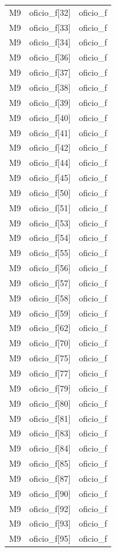 \begin{longtable}{lll}
M9 & oficio\_f[32] & oficio\_f \\
M9 & oficio\_f[33] & oficio\_f \\
M9 & oficio\_f[34] & oficio\_f \\
M9 & oficio\_f[36] & oficio\_f \\
M9 & oficio\_f[37] & oficio\_f \\
M9 & oficio\_f[38] & oficio\_f \\
M9 & oficio\_f[39] & oficio\_f \\
M9 & oficio\_f[40] & oficio\_f \\
M9 & oficio\_f[41] & oficio\_f \\
M9 & oficio\_f[42] & oficio\_f \\
M9 & oficio\_f[44] & oficio\_f \\
M9 & oficio\_f[45] & oficio\_f \\
M9 & oficio\_f[50] & oficio\_f \\
M9 & oficio\_f[51] & oficio\_f \\
M9 & oficio\_f[53] & oficio\_f \\
M9 & oficio\_f[54] & oficio\_f \\
M9 & oficio\_f[55] & oficio\_f \\
M9 & oficio\_f[56] & oficio\_f \\
M9 & oficio\_f[57] & oficio\_f \\
M9 & oficio\_f[58] & oficio\_f \\
M9 & oficio\_f[59] & oficio\_f \\
M9 & oficio\_f[62] & oficio\_f \\
M9 & oficio\_f[70] & oficio\_f \\
M9 & oficio\_f[75] & oficio\_f \\
M9 & oficio\_f[77] & oficio\_f \\
M9 & oficio\_f[79] & oficio\_f \\
M9 & oficio\_f[80] & oficio\_f \\
M9 & oficio\_f[81] & oficio\_f \\
M9 & oficio\_f[83] & oficio\_f \\
M9 & oficio\_f[84] & oficio\_f \\
M9 & oficio\_f[85] & oficio\_f \\
M9 & oficio\_f[87] & oficio\_f \\
M9 & oficio\_f[90] & oficio\_f \\
M9 & oficio\_f[92] & oficio\_f \\
M9 & oficio\_f[93] & oficio\_f \\
M9 & oficio\_f[95] & oficio\_f \\

\end{longtable}
